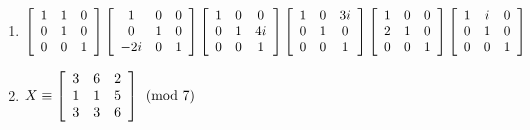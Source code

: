\begin{enumerate}[!HW!, start=1]
\itemspade $A =  \mtx{rrr}{0&0&1\\0&1&0\\1&0&0}\mtx{rrr}{1&0&0\\-3&1&0\\0&0&1}\mtx{rrr}{1&0&0\\0&1&0\\-6&0&1}\mtx{rrr}{1&0&0\\0&1&0\\0&2&1}\mtx{rrr}{1&0&-2\\0&1&0\\0&0&1}\mtx{rrr}{1&-1&0\\0&1&0\\0&0&1}$
\itemspade \begin{multline*} A =   \mtx{rrr}{0&1&0\\1&0&0\\0&0&1}\mtx{rrr}{-1&0&0\\0&1&0\\0&0&1}\mtx{rrr}{1&0&0\\5&1&0\\0&0&1}\mtx{rrr}{1&0&0\\0&1&0\\2&0&1}\mtx{rrr}{1&0&0\\0&1&1\\0&0&1}\mtx{rrr}{1&0&0\\0&2&0\\0&0&1}\cdot\\ \cdot\mtx{rcr}{1&0&0\\0&1&0\\0&12&1}\mtx{rrr}{1&0&0\\0&1&0\\0&0&2}\mtx{rrr}{1&0&-2\\0&1&0\\0&0&1}\mtx{rcr}{1&-16&0\\0&1&0\\0&0&1}\end{multline*}

\item $\mtx{ccc}{1&1&0\\0&1&0\\0&0&1}\mtx{ccc}{1&0&0\\0&1&0\\-2i&0&1}\mtx{ccc}{1&0&0\\0&1&4i\\0&0&1}\mtx{ccc}{1&0&3i\\0&1&0\\0&0&1}\mtx{ccc}{1&0&0\\2&1&0\\0&0&1}\mtx{ccc}{1&i&0\\0&1&0\\0&0&1}$ %

\item $X\equiv \mtx{rrr}{3&6&2\\1&1&5\\3&3&6}\pmod 7$ %
\end{enumerate}

\vspace{-15 pt}